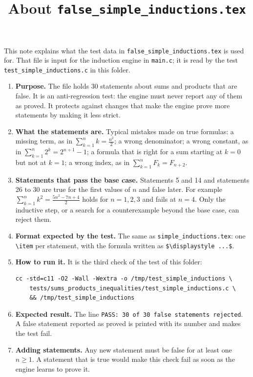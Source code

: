 \documentclass[11pt,a4paper]{article}
\title{About \texttt{false\_simple\_inductions.tex}}
\author{}
\date{}
\begin{document}
\maketitle
This note explains what the test data in \texttt{false\_simple\_inductions.tex} is used for. That file is input for the induction engine in \texttt{main.c}; it is read by the test \texttt{test\_simple\_inductions.c} in this folder.

\begin{enumerate}
\item \textbf{Purpose.} The file holds 30 statements about sums and products that are false. It is an anti-regression test: the engine must never report any of them as proved. It protects against changes that make the engine prove more statements by making it less strict.

\item \textbf{What the statements are.} Typical mistakes made on true formulas: a missing term, as in $\displaystyle \sum_{k=1}^{n} k = \frac{n^{2}}{2}$; a wrong denominator; a wrong constant, as in $\displaystyle \sum_{k=1}^{n} 2^{k} = 2^{n + 1} - 1$; a formula that is right for a sum starting at $k = 0$ but not at $k = 1$; a wrong index, as in $\displaystyle \sum_{k=1}^{n} F_{k} = F_{n + 2}$.

\item \textbf{Statements that pass the base case.} Statements 5 and 14 and statements 26 to 30 are true for the first values of $n$ and false later. For example $\displaystyle \sum_{k=1}^{n} k^{2} = \frac{5n^{2} - 7n + 4}{2}$ holds for $n = 1, 2, 3$ and fails at $n = 4$. Only the inductive step, or a search for a counterexample beyond the base case, can reject them.

\item \textbf{Format expected by the test.} The same as \texttt{simple\_inductions.tex}: one \texttt{\textbackslash item} per statement, with the formula written as \texttt{\$\textbackslash displaystyle ...\$}.

\item \textbf{How to run it.} It is the third check of the test of this folder:
\begin{verbatim}
cc -std=c11 -O2 -Wall -Wextra -o /tmp/test_simple_inductions \
    tests/sums_products_inequalities/test_simple_inductions.c \
    && /tmp/test_simple_inductions
\end{verbatim}

\item \textbf{Expected result.} The line \texttt{PASS: 30 of 30 false statements rejected}. A false statement reported as proved is printed with its number and makes the test fail.

\item \textbf{Adding statements.} Any new statement must be false for at least one $n \ge 1$. A statement that is true would make this check fail as soon as the engine learns to prove it.
\end{enumerate}
\end{document}

